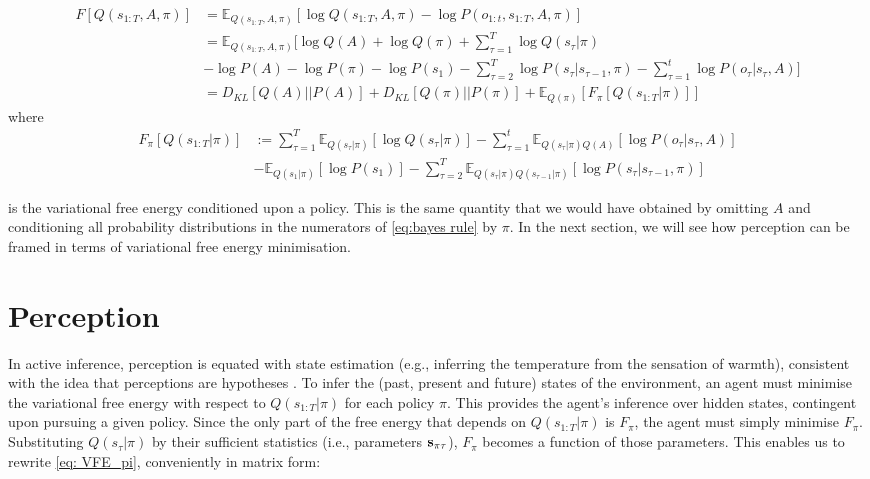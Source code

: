 \documentclass{article}
\newcommand{\E}{\mathbb E}
\begin{document}
  	\begin{equation}
  	\label{eq: computing VFE}
  	    \begin{split}
  	        F[Q(s_{1:T},A, \pi)]&= \E_{Q(s_{1:T},A, \pi)}[\log Q(s_{1:T},A, \pi) - \log P(o_{1:t},s_{1:T},A, \pi)] \\
  	        &= \E_{Q(s_{1:T},A, \pi)}[\log Q(A) +  \log Q(\pi)+\sum_{\tau = 1}^T  \log Q(s_\tau|\pi) \\
  	        &-\log P(A) -\log P(\pi)- \log P(s_1)- \sum_{\tau =2}^T\log P(s_\tau |s_{\tau-1},\pi)-\sum_{\tau = 1}^t \log P(o_{\tau}|s_{\tau},A)] \\
  	        &=D_{KL}[Q(A)||P(A)]+D_{KL}[Q(\pi)||P(\pi)]+\E_{Q(\pi)}[F_\pi[Q(s_{1:T}|\pi)]]
  	    \end{split}
  	\end{equation}
where
\begin{equation}
  	\label{eq: VFE_pi}
  	    \begin{split}
  	        F_\pi[Q(s_{1:T}|\pi)] & := \sum_{\tau =1}^T\E_{Q(s_\tau |\pi)}[\log Q(s_\tau |\pi)] -\sum_{\tau = 1}^t \E_{Q(s_\tau |\pi)Q(A)}[\log P(o_{\tau}|s_{\tau},A)] \\
  	        &-\E_{Q(s_1 |\pi)}[\log P(s_1)]-\sum_{\tau =2}^T \E_{Q(s_\tau |\pi)Q(s_{\tau-1} |\pi)}[\log P(s_\tau |s_{\tau-1},\pi)]
      	    \end{split}
  	\end{equation}
  	
is the variational free energy conditioned upon a policy. This is the same quantity that we would have obtained by omitting $A$ and conditioning all probability distributions in the numerators of \eqref{eq:bayes rule} by $\pi$. In the next section, we will see how perception can be framed in terms of variational free energy minimisation.

\section{Perception}

In active inference, perception is equated with state estimation \cite{fristonActiveInferenceProcess2017} (e.g., inferring the temperature from the sensation of warmth), consistent with the idea that perceptions are hypotheses \cite{gregoryPerceptionsHypotheses1980}. To infer the (past, present and future) states of the environment, an agent must minimise the variational free energy with respect to $Q(s_{1:T}|\pi)$ for each policy $\pi$. This provides the agent’s inference over hidden states, contingent upon pursuing a given policy. Since the only part of the free energy that depends on $Q(s_{1:T}|\pi)$ is $F_\pi$, the agent must simply minimise $F_\pi$. 
Substituting $Q(s_{\tau}|\pi)$ by their sufficient statistics (i.e., parameters $\bold s_{\pi \tau}$), $F_\pi$ becomes a function of those parameters. This enables us to rewrite \eqref{eq: VFE_pi}, conveniently in matrix form:
\end{document}

